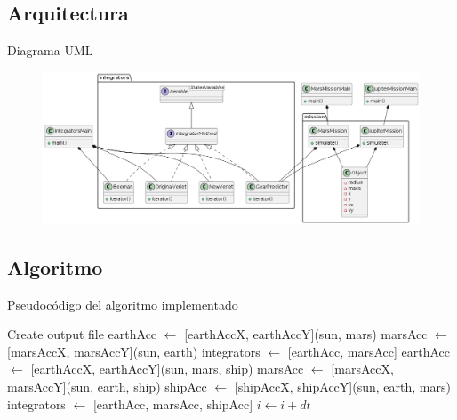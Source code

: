 \documentclass{beamer}
\begin{document}
        \subsection{Arquitectura}

            \begin{frame}{Diagrama UML}
                \begin{figure}[htbp]
                    \centering
                    \includegraphics[width=\textwidth]{./architecture}
                    \label{fig:architecture}
                \end{figure}
            \end{frame}

        \subsection{Algoritmo}

            \begin{frame}{Pseudocódigo del algoritmo implementado}{}
                \begin{algorithmic}[1]
                    \ttfamily \scriptsize
                    \State Create output file
                    \State earthAcc $\gets$ [earthAccX, earthAccY](sun, mars)
                    \State marsAcc $\gets$ [marsAccX, marsAccY](sun, earth)
                    \State integrators $\gets$ [earthAcc, marsAcc]
                            \State earthAcc $\gets$ [earthAccX, earthAccY](sun, mars, ship)
                            \State marsAcc $\gets$ [marsAccX, marsAccY](sun, earth, ship)
                            \State shipAcc $\gets$ [shipAccX, shipAccY](sun, earth, mars)
                            \State integrators $\gets$ [earthAcc, marsAcc, shipAcc]
                        \EndIf
                        \State {}
                        \State {}
                            \State {}
                        \EndIf
                        \State {}
                        \State $i \gets i + dt$
                    \EndWhile
                \end{algorithmic}
            \end{frame}
\end{document}
